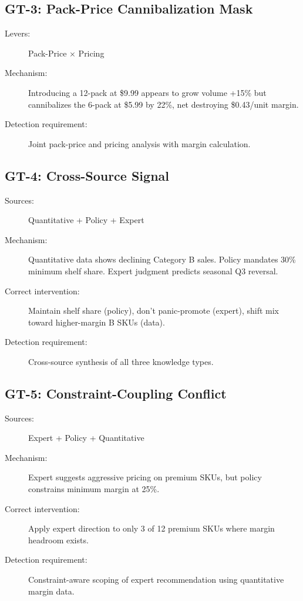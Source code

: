 \subsection{GT-3: Pack-Price Cannibalization Mask}

\begin{description}
    \item[Levers:] Pack-Price $\times$ Pricing
    \item[Mechanism:] Introducing a 12-pack at \$9.99 appears to grow volume +15\% but cannibalizes the 6-pack at \$5.99 by 22\%, net destroying \$0.43/unit margin.
    \item[Detection requirement:] Joint pack-price and pricing analysis with margin calculation.
\end{description}

\subsection{GT-4: Cross-Source Signal}

\begin{description}
    \item[Sources:] Quantitative + Policy + Expert
    \item[Mechanism:] Quantitative data shows declining Category B sales. Policy mandates 30\% minimum shelf share. Expert judgment predicts seasonal Q3 reversal.
    \item[Correct intervention:] Maintain shelf share (policy), don't panic-promote (expert), shift mix toward higher-margin B SKUs (data).
    \item[Detection requirement:] Cross-source synthesis of all three knowledge types.
\end{description}

\subsection{GT-5: Constraint-Coupling Conflict}

\begin{description}
    \item[Sources:] Expert + Policy + Quantitative
    \item[Mechanism:] Expert suggests aggressive pricing on premium SKUs, but policy constrains minimum margin at 25\%.
    \item[Correct intervention:] Apply expert direction to only 3 of 12 premium SKUs where margin headroom exists.
    \item[Detection requirement:] Constraint-aware scoping of expert recommendation using quantitative margin data.
\end{description}

